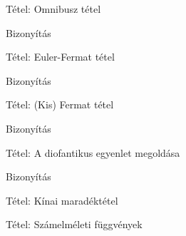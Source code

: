 \documentclass{beamer}
\begin{document}
\begin{frame}

\begin{block}{Tétel: Omnibusz tétel}
\end{block}

\begin{block}{Bizonyítás}
\end{block}

\end{frame}

\begin{frame}

\begin{block}{Tétel: Euler-Fermat tétel}
\end{block}

\begin{block}{Bizonyítás}
\end{block}

\end{frame}

\begin{frame}

\begin{block}{Tétel: (Kis) Fermat tétel}
\end{block}

\begin{block}{Bizonyítás}
\end{block}

\end{frame}

\begin{frame}

\begin{block}{Tétel: A diofantikus egyenlet megoldása}
\end{block}

\begin{block}{Bizonyítás}
\end{block}

\end{frame}

\begin{frame}

\begin{block}{Tétel: Kínai maradéktétel}
\end{block}

\end{frame}

\begin{frame}

\begin{block}{Tétel: Számelméleti függvények}
\end{block}

\end{frame}
\end{document}
